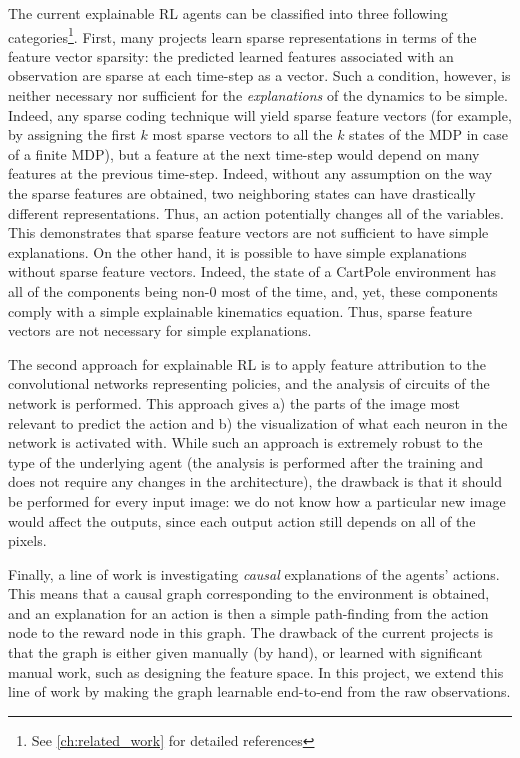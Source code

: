 \documentclass[a4paper,11pt,oneside]{report}
\begin{document}
The current explainable RL agents can be classified into three following categories\footnote{See \autoref{ch:related_work} for detailed references}. First, many projects learn sparse representations in terms of the feature vector sparsity: the predicted learned features associated with an observation are sparse at each time-step as a vector. Such a condition, however, is neither necessary nor sufficient for the {\em explanations} of the dynamics to be simple. Indeed, any sparse coding technique will yield sparse feature vectors (for example, by assigning the first $k$ most sparse vectors to all the $k$ states of the MDP in case of a finite MDP), but a feature at the next time-step would depend on many features at the previous time-step. Indeed, without any assumption on the way the sparse features are obtained, two neighboring states can have drastically different representations. Thus, an action potentially changes all of the variables. This demonstrates that sparse feature vectors are not sufficient to have simple explanations. On the other hand, it is possible to have simple explanations without sparse feature vectors. Indeed, the state of a CartPole environment has all of the components being non-0 most of the time, and, yet, these components comply with a simple explainable kinematics equation. Thus, sparse feature vectors are not necessary for simple explanations.

The second approach for explainable RL \cite{hilton2020understanding} is to apply feature attribution to the convolutional networks representing policies, and the analysis of circuits of the network is performed. This approach gives a) the parts of the image most relevant to predict the action and b) the visualization of what each neuron in the network is activated with. While such an approach is extremely robust to the type of the underlying agent (the analysis is performed after the training and does not require any changes in the architecture), the drawback is that it should be performed for every input image: we do not know how a particular new image would affect the outputs, since each output action still depends on all of the pixels.

Finally, a line of work is investigating {\em causal} explanations of the agents' actions. This means that a causal graph corresponding to the environment is obtained, and an explanation for an action is then a simple path-finding from the action node to the reward node in this graph. The drawback of the current projects is that the graph is either given manually (by hand), or learned with significant manual work, such as designing the feature space. In this project, we extend this line of work by making the graph learnable end-to-end from the raw observations.
\end{document}
